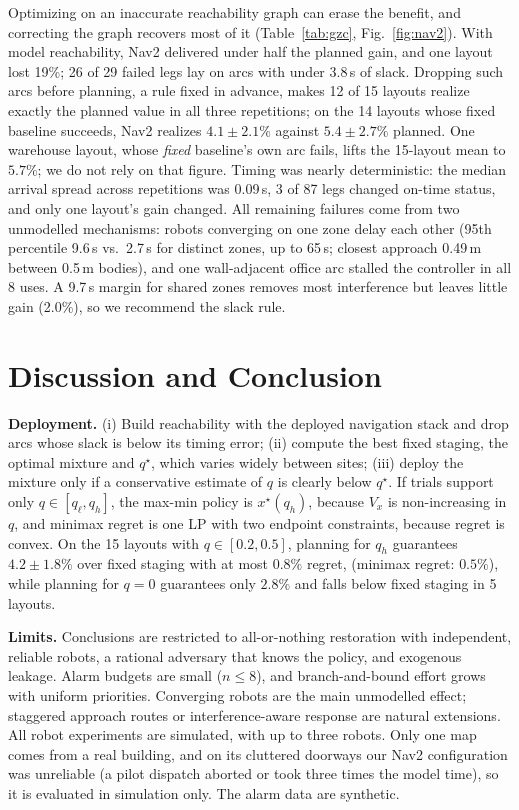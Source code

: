 \documentclass[letterpaper,journal]{IEEEtran}
\theoremstyle{remark}
\begin{document}
Optimizing on an inaccurate reachability graph can erase the benefit, and correcting the graph recovers most of it (Table~\ref{tab:gzc}, Fig.~\ref{fig:nav2}). With model reachability, Nav2 delivered under half the planned gain, and one layout lost 19\%; 26 of 29 failed legs lay on arcs with under 3.8\,s of slack. Dropping such arcs before planning, a rule fixed in advance, makes 12 of 15 layouts realize exactly the planned value in all three repetitions; on the 14 layouts whose fixed baseline succeeds, Nav2 realizes $4.1\pm2.1\%$ against $5.4\pm2.7\%$ planned. One warehouse layout, whose \emph{fixed} baseline's own arc fails, lifts the 15-layout mean to $5.7\%$; we do not rely on that figure. Timing was nearly deterministic: the median arrival spread across repetitions was 0.09\,s, 3 of 87 legs changed on-time status, and only one layout's gain changed. All remaining failures come from two unmodelled mechanisms: robots converging on one zone delay each other (95th percentile 9.6\,s vs.\ 2.7\,s for distinct zones, up to 65\,s; closest approach 0.49\,m between 0.5\,m bodies), and one wall-adjacent office arc stalled the controller in all 8 uses. A 9.7\,s margin for shared zones removes most interference but leaves little gain (2.0\%), so we recommend the slack rule.

\section{Discussion and Conclusion}
\textbf{Deployment.} (i) Build reachability with the deployed navigation stack and drop arcs whose slack is below its timing error; (ii) compute the best fixed staging, the optimal mixture and $q^\star$, which varies widely between sites; (iii) deploy the mixture only if a conservative estimate of $q$ is clearly below $q^\star$. If trials support only $q\in[q_\ell,q_h]$, the max-min policy is $x^\star(q_h)$, because $V_x$ is non-increasing in $q$, and minimax regret is one LP with two endpoint constraints, because regret is convex. On the 15 layouts with $q\in[0.2,0.5]$, planning for $q_h$ guarantees $4.2\pm1.8\%$ over fixed staging with at most $0.8\%$ regret, (minimax regret: $0.5\%$), while planning for $q=0$ guarantees only $2.8\%$ and falls below fixed staging in 5 layouts.

\textbf{Limits.} Conclusions are restricted to all-or-nothing restoration with independent, reliable robots, a rational adversary that knows the policy, and exogenous leakage. Alarm budgets are small ($n\le8$), and branch-and-bound effort grows with uniform priorities. Converging robots are the main unmodelled effect; staggered approach routes or interference-aware response are natural extensions. All robot experiments are simulated, with up to three robots. Only one map comes from a real building, and on its cluttered doorways our Nav2 configuration was unreliable (a pilot dispatch aborted or took three times the model time), so it is evaluated in simulation only. The alarm data are synthetic.
\end{document}
